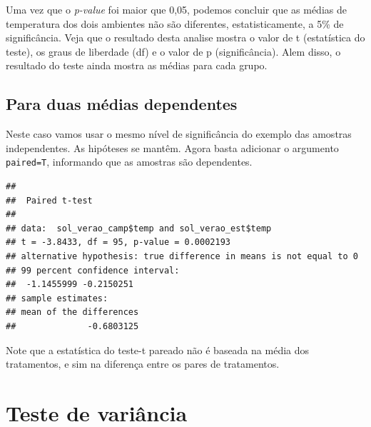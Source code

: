 \documentclass[
]{book}
\newenvironment{Shaded}{\begin{snugshade}}{\end{snugshade}}
\newcommand{\CommentTok}[1]{\textcolor[rgb]{0.56,0.35,0.01}{\textit{#1}}}
\newcommand{\DataTypeTok}[1]{\textcolor[rgb]{0.13,0.29,0.53}{#1}}
\newcommand{\FloatTok}[1]{\textcolor[rgb]{0.00,0.00,0.81}{#1}}
\newcommand{\KeywordTok}[1]{\textcolor[rgb]{0.13,0.29,0.53}{\textbf{#1}}}
\newcommand{\NormalTok}[1]{#1}
\newcommand{\OperatorTok}[1]{\textcolor[rgb]{0.81,0.36,0.00}{\textbf{#1}}}
\begin{document}
Uma vez que o \emph{p-value} foi maior que 0,05, podemos concluir que as médias de temperatura dos dois ambientes não são diferentes, estatisticamente, a 5\% de significância.
Veja que o resultado desta analise mostra o valor de t (estatística do teste), os graus de liberdade (df) e o valor de p (significância). Alem disso, o resultado do teste ainda mostra as médias para cada grupo.

\hypertarget{para-duas-muxe9dias-dependentes}{%
\subsection{Para duas médias dependentes}\label{para-duas-muxe9dias-dependentes}}

Neste caso vamos usar o mesmo nível de significância do exemplo das amostras independentes.
As hipóteses se mantêm. Agora basta adicionar o argumento \texttt{paired=T}, informando que as amostras são dependentes.

\begin{Shaded}
\end{Shaded}

\begin{verbatim}
## 
##  Paired t-test
## 
## data:  sol_verao_camp$temp and sol_verao_est$temp
## t = -3.8433, df = 95, p-value = 0.0002193
## alternative hypothesis: true difference in means is not equal to 0
## 99 percent confidence interval:
##  -1.1455999 -0.2150251
## sample estimates:
## mean of the differences 
##              -0.6803125
\end{verbatim}

Note que a estatística do teste-t pareado não é baseada na média dos tratamentos, e sim na diferença entre os pares de tratamentos.

\hypertarget{teste-de-variuxe2ncia}{%
\section{Teste de variância}\label{teste-de-variuxe2ncia}}
\end{document}
